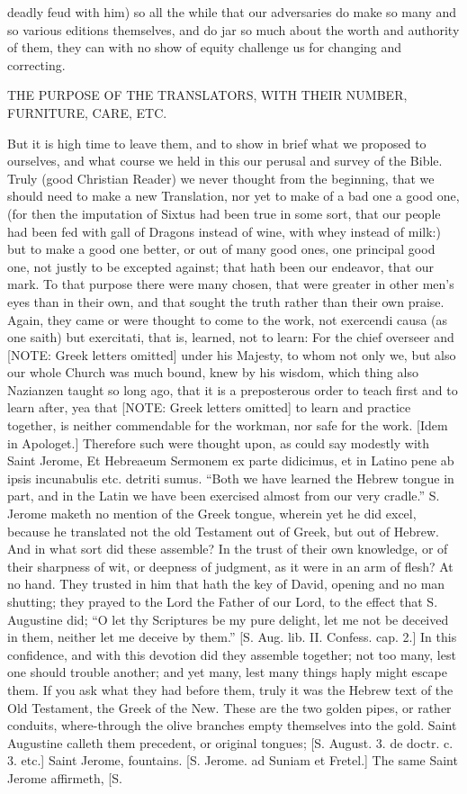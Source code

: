 {deadly feud with him) so all the while that our adversaries do make so many and so various editions themselves, and do jar so much about the worth and authority of them, they can with no show of equity challenge us for changing and correcting.
\par }{\IS THE PURPOSE OF THE TRANSLATORS, WITH THEIR NUMBER, FURNITURE, CARE, ETC.
\par }{\IP But it is high time to leave them, and to show in brief what we proposed to ourselves, and what course we held in this our perusal and survey of the Bible. Truly (good Christian Reader) we never thought from the beginning, that we should need to make a new Translation, nor yet to make of a bad one a good one, (for then the imputation of Sixtus had been true in some sort, that our people had been fed with gall of Dragons instead of wine, with whey instead of milk:) but to make a good one better, or out of many good ones, one principal good one, not justly to be excepted against; that hath been our endeavor, that our mark. To that purpose there were many chosen, that were greater in other men’s eyes than in their own, and that sought the truth rather than their own praise. Again, they came or were thought to come to the work, not exercendi causa (as one saith) but exercitati, that is, learned, not to learn: For the chief overseer and [NOTE: Greek letters omitted] under his Majesty, to whom not only we, but also our whole Church was much bound, knew by his wisdom, which thing also Nazianzen taught so long ago, that it is a preposterous order to teach first and to learn after, yea that [NOTE: Greek letters omitted] to learn and practice together, is neither commendable for the workman, nor safe for the work. [Idem in Apologet.] Therefore such were thought upon, as could say modestly with Saint Jerome, Et Hebreaeum Sermonem ex parte didicimus, et in Latino pene ab ipsis incunabulis etc. detriti sumus. “Both we have learned the Hebrew tongue in part, and in the Latin we have been exercised almost from our very cradle.” S. Jerome maketh no mention of the Greek tongue, wherein yet he did excel, because he translated not the old Testament out of Greek, but out of Hebrew. And in what sort did these assemble? In the trust of their own knowledge, or of their sharpness of wit, or deepness of judgment, as it were in an arm of flesh? At no hand. They trusted in him that hath the key of David, opening and no man shutting; they prayed to the Lord the Father of our Lord, to the effect that S. Augustine did; “O let thy Scriptures be my pure delight, let me not be deceived in them, neither let me deceive by them.” [S. Aug. lib. II. Confess. cap. 2.] In this confidence, and with this devotion did they assemble together; not too many, lest one should trouble another; and yet many, lest many things haply might escape them. If you ask what they had before them, truly it was the Hebrew text of the Old Testament, the Greek of the New. These are the two golden pipes, or rather conduits, where-through the olive branches empty themselves into the gold. Saint Augustine calleth them precedent, or original tongues; [S. August. 3. de doctr. c. 3. etc.] Saint Jerome, fountains. [S. Jerome. ad Suniam et Fretel.] The same Saint Jerome affirmeth, [S. }
